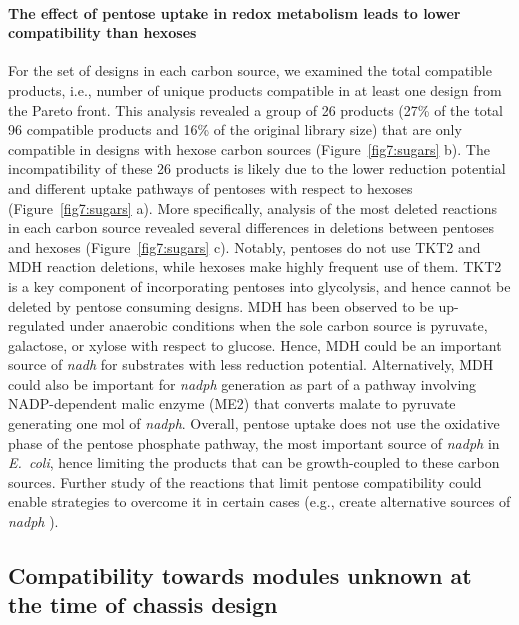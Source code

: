 {\paragraph{The effect of pentose uptake in redox metabolism leads to lower compatibility than hexoses}
For the set of designs in each carbon source, we examined the total compatible products, i.e., number of unique products compatible in at least one design from the Pareto front.
This analysis revealed a group of 26 products (27\% of the total 96 compatible products and 16\% of the original library size) that are only compatible in designs with hexose carbon sources  (Figure~\ref{fig7:sugars} b).
The incompatibility of these 26 products is likely due to the
 lower reduction potential and different uptake pathways of pentoses with respect to hexoses (Figure~\ref{fig7:sugars} a).
More specifically, analysis of the most deleted reactions in each carbon source revealed several differences in deletions between pentoses and hexoses (Figure~\ref{fig7:sugars} c).
Notably, pentoses do not use TKT2 and MDH reaction deletions, while hexoses make highly frequent use of them.
TKT2 is a key component of incorporating pentoses into glycolysis, and hence cannot be deleted by pentose consuming designs.
MDH  has been observed to be up-regulated under anaerobic conditions when the sole carbon source is pyruvate, galactose, or xylose with respect to glucose.\citep{park1995}
Hence, MDH could be an important source of \textit{nadh} for substrates with less reduction potential. %
Alternatively, MDH could also be important for \textit{nadph} generation as part of a pathway involving NADP-dependent malic enzyme (ME2) that converts malate to pyruvate generating one mol of \textit{nadph}.
Overall, pentose uptake does not use the oxidative phase of the pentose phosphate pathway, the most important source of \textit{nadph} in \textit{E.~coli},\citep{christodoulou2018}
hence limiting the products that can be growth-coupled to these carbon sources.
Further study of the reactions that limit pentose compatibility could enable strategies to overcome it in certain cases (e.g., create alternative sources of \textit{nadph} \citep{lee2013, ng2015c}).


\subsection{Compatibility towards modules unknown at the time of chassis design}

}
